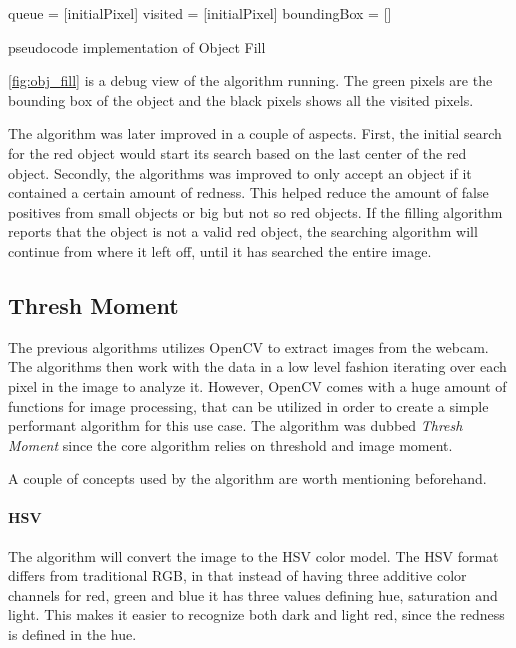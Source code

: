 \begin{algorithm}[H]
	queue = [initialPixel]\;
	visited = [initialPixel]\;
	boundingBox = []\;
 	\BlankLine
 	\caption{pseudocode implementation of Object Fill}
\end{algorithm}

\autoref{fig:obj_fill} is a debug view of the algorithm running.
The green pixels are the bounding box of the object and the black pixels shows all the visited pixels.


The algorithm was later improved in a couple of aspects.
First, the initial search for the red object would start its search based on the last center of the red object.
Secondly, the algorithms was improved to only accept an object if it contained a certain amount of redness.
This helped reduce the amount of false positives from small objects or big but not so red objects.
If the filling algorithm reports that the object is not a valid red object, the searching algorithm will continue from where it left off, until it has searched the entire image.

\subsection{Thresh Moment}\label{des:thresh}

The previous algorithms utilizes OpenCV to extract images from the webcam. 
The algorithms then work with the data in a low level fashion iterating over each pixel in the image to analyze it.
However, OpenCV comes with a huge amount of functions for image processing, that can be utilized in order to create a simple performant algorithm for this use case. 
The algorithm was dubbed \textit{Thresh Moment} since the core algorithm relies on threshold and image moment.

A couple of concepts used by the algorithm are worth mentioning beforehand.

\paragraph{HSV}
The algorithm will convert the image to the HSV color model.
The HSV format differs from traditional RGB, in that instead of having three additive color channels for red, green and blue it has three values defining hue, saturation and light.
This makes it easier to recognize both dark and light red, since the redness is defined in the hue.

